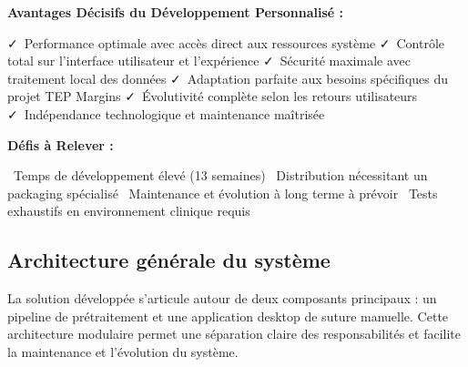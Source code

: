 \documentclass[12pt,a4paper]{report}
\newcommand{\pro}[1]{\textcolor{SuccessGreen}{\faCheck\ #1}}
\newcommand{\con}[1]{\textcolor{DangerRed}{\faTimes\ #1}}
\begin{document}
\begin{}
\begin{}
\begin{}
\begin{}
\begin{tcolorbox}[colback=SuccessGreen!10, colframe=SuccessGreen, title=Développement Personnalisé - Solution Optimale]
\vspace{0.5cm}

\textbf{Avantages Décisifs du Développement Personnalisé :}
\begin{itemize}[leftmargin=*]
    \pro{Performance optimale avec accès direct aux ressources système}
    \pro{Contrôle total sur l'interface utilisateur et l'expérience}
    \pro{Sécurité maximale avec traitement local des données}
    \pro{Adaptation parfaite aux besoins spécifiques du projet TEP Margins}
    \pro{Évolutivité complète selon les retours utilisateurs}
    \pro{Indépendance technologique et maintenance maîtrisée}
\end{itemize}

\vspace{0.5cm}

\textbf{Défis à Relever :}
\begin{itemize}[leftmargin=*]
    \con{Temps de développement élevé (13 semaines)}
    \con{Distribution nécessitant un packaging spécialisé}
    \con{Maintenance et évolution à long terme à prévoir}
    \con{Tests exhaustifs en environnement clinique requis}
\end{itemize}

\end{tcolorbox}

\subsection{Architecture générale du système}

La solution développée s'articule autour de deux composants principaux : un pipeline de prétraitement et une application desktop de suture manuelle. Cette architecture modulaire permet une séparation claire des responsabilités et facilite la maintenance et l'évolution du système.

\begin{figure}[H]
\centering
{}
\end{figure}
\end{}
\end{}
\end{}
\end{}
\end{document}
